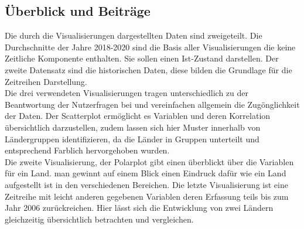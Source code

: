 \subsection{Überblick und Beiträge}
Die durch die Visualisierungen dargestellten Daten sind zweigeteilt. Die Durchschnitte der Jahre 2018-2020 sind die Basis aller Visualisierungen die keine Zeitliche Komponente enthalten. Sie sollen einen Ist-Zustand darstellen. Der zweite Datensatz sind die historischen Daten, diese bilden die Grundlage für die Zeitreihen Darstellung. \\

Die drei verwendeten Visualisierungen tragen unterschiedlich zu der Beantwortung der Nutzerfragen bei und vereinfachen allgemein die Zugönglichkeit der Daten. Der Scatterplot ermöglicht es Variablen und deren Korrelation übersichtlich darzustellen, zudem lassen sich hier Muster innerhalb von Ländergruppen identifizieren, da die Länder in Gruppen unterteilt und entsprechend Farblich hervorgehoben wurden. \\

Die zweite Visualisierung, der Polarplot gibt einen überblickt über die Variablen für ein Land. man gewinnt auf einem Blick einen Eindruck dafür wie ein Land aufgestellt ist in den verschiedenen Bereichen. Die letzte Visualisierung ist eine Zeitreihe mit leicht anderen gegebenen Variablen deren Erfassung teils bis zum Jahr 2006 zurückreichen. Hier lässt sich die Entwicklung von zwei Ländern gleichzeitig übersichtlich betrachten und vergleichen.
